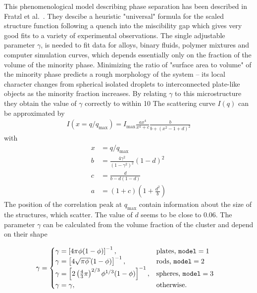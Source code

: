 This phenomenological model describing phase separation has been described in Fratzl et al.\ \cite{Fratzl1989}.
They descibe a heuristic "universal" formula for the scaled structure function following
a quench into the miscibility gap which gives very good fits to a variety of experimental observations. The
single adjustable parameter $\gamma$, is needed to fit data for alloys, binary fluids, polymer mixtures and computer
simulation curves, which depends essentially only on the fraction of the volume of the minority phase. Minimizing
the ratio of "surface area to volume" of the minority phase predicts a rough morphology of the system -- its
local character changes from spherical isolated droplets to interconnected plate-like objects as the minority
fraction increases. By relating $\gamma$ to this microstructure they obtain the value of $\gamma$ correctly to within 10%
 The scattering curve $I(q)$ can be approximated by
\begin{align}
\label{eq:spinodal2}
I(x=q/q_\mathrm{max}) = I_\text{max} \frac{ax^4}{x^4+c} \frac{b}{b+\left(x^2-1+d\right)^2}
\end{align}
with
\begin{align}
  x &= q/q_\text{max} \\
  b &= \frac{4\gamma^2}{\left(1-\gamma^2\right)^2} \left(1-d\right)^2 \\
  c &= \frac{d}{b-d(1-d)} \\
  a &= (1+c) \left(1+\frac{d^2}{b}\right)
\end{align}
The position of the correlation peak at $q_\text{max}$ contain
information about the size of the structures, which scatter. The value of $d$ seems to 
be close to 0.06. 
The parameter $\gamma$ can be calculated from the volume fraction of the cluster and depend on their shape

\begin{align}\label{eq:gamma_phi}
  \gamma &=
  \begin{cases}
    \gamma=\left[4\pi\phi(1-\phi)\right]^{-1}, & \mbox{plates, \texttt{model}}=1 \\
    \gamma=\left[4\sqrt{\pi\phi}(1-\phi)\right]^{-1}, & \mbox{rods, \texttt{model}}=2 \\
    \gamma=\left[2\left(\frac43\pi\right)^{2/3}\phi^{1/3}(1-\phi)\right]^{-1}, & \mbox{spheres, \texttt{model}}=3 \\
    \gamma=\gamma, & \mbox{otherwise}.
  \end{cases}
\end{align}

